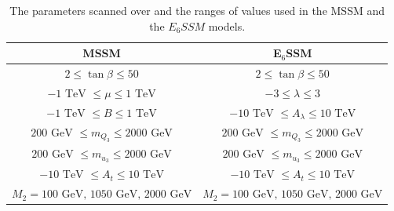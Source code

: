 \documentclass[preprint,amsmath,amssymb,aps,superscriptaddress,prd,showpacs,floatfix,nofootinbib]{revtex4-1}
\begin{document}
\begin{table}[h]
\centering
\begin{ruledtabular}
\begin{tabular}{cc}
MSSM & E$_6$SSM \\
\hline
$2 \leq \tan\beta \leq 50$& $2 \leq \tan\beta \leq 50$ \\
$-1\textrm{ TeV } \leq \mu \leq 1 \textrm{ TeV}$ & $-3 \leq \lambda \leq 3$\\
$-1\textrm{ TeV } \leq B \leq 1\textrm{ TeV}$ & $-10\textrm{ TeV } \leq A_\lambda \leq 10\textrm{ TeV}$ \\
$ 200 \textrm{ GeV } \leq m_{Q_3} \leq 2000 \textrm { GeV}$ & $ 200 \textrm{ GeV } \leq m_{Q_3} \leq 2000 \textrm { GeV}$\\
$ 200 \textrm{ GeV } \leq m_{u_3} \leq 2000 \textrm { GeV}$ & $ 200 \textrm{ GeV } \leq m_{u_3} \leq 2000 \textrm { GeV}$\\
$ -10 \textrm{ TeV } \leq A_t \leq 10 \textrm { TeV}$ & $ -10 \textrm{ TeV } \leq A_t \leq 10 \textrm { TeV}$\\
$M_2=100\textrm{ GeV, } 1050\textrm{ GeV, } 2000 \textrm{ GeV}$ & $M_2=100\textrm{ GeV, } 1050\textrm{ GeV, } 2000 \textrm{ GeV}$ \\
\end{tabular}
\end{ruledtabular}
\caption{The parameters scanned over and the ranges of values used in
  the MSSM and the $E_6SSM$ models.}
\label{tab:scanranges}
\end{table}

\end{document}
